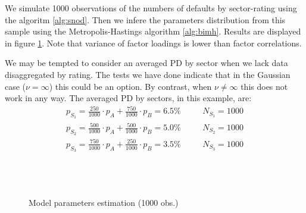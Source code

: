\documentclass[11pt,fleqn]{book} %
\begin{document}
\begin{example}[1000 observations]
	We simulate 1000 observations of the numbers of defaults by sector-rating 
	using the algoritm \ref{alg:snod}. Then we infere the parameters 
	distribution from this sample using the Metropolis-Hastings algorithm 
	\ref{alg:bimh}. Results are displayed in figure \ref{fig:calib1}.
	Note that variance of factor loadings is lower than factor correlations.
	
	We may be tempted to consider an averaged PD by sector when we lack data 
	disaggregated by rating. The tests we have done indicate that in the Gaussian 
	case ($\nu = \infty$) this could be an option. By contrast, when $\nu \ne \infty$ 
	this does not work in any way. The averaged PD by sectors, in this example, are:
	\begin{displaymath}
		\begin{array}{lll}
			p_{S_1} = \frac{250}{1000} \cdot p_A + \frac{750}{1000} \cdot p_B = 6.5\% & \quad & N_{S_1} = 1000 \\
			p_{S_2} = \frac{500}{1000} \cdot p_A + \frac{500}{1000} \cdot p_B = 5.0\% & \quad & N_{S_2} = 1000 \\
			p_{S_3} = \frac{750}{1000} \cdot p_A + \frac{250}{1000} \cdot p_B = 3.5\% & \quad & N_{S_3} = 1000 \\
		\end{array}
	\end{displaymath}
	
	\begin{figure}[!ht]
		\centering
		\hfill
		\\
		\\
		\caption{Model parameters estimation (1000 obs.)}
		\label{fig:calib1}
	\end{figure}


\end{example}
\end{document}
